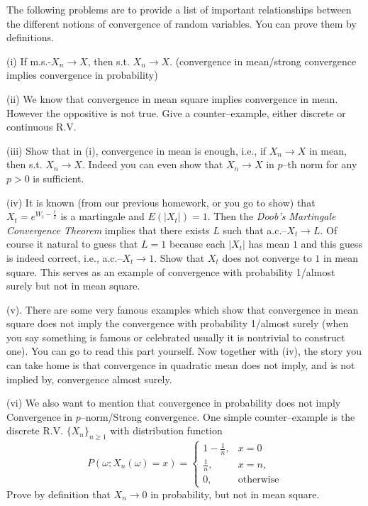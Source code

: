     \problem
    \begin{question}
        The following problems are to provide a list of important relationships
        between the different notions of convergence of random variables.
        You can prove them by definitions.

        \noindent(i)  If m.s.-$X_n\rightarrow X$, then s.t. $X_n\rightarrow X$.
        (convergence in mean/strong convergence implies convergence in probability)

        \noindent(ii)  We know that convergence in mean square implies convergence
        in mean.  However the oppositive is not true.  Give a counter--example,
        either discrete or continuous R.V.

        \noindent(iii)  Show that in (i), convergence in mean is enough,
        i.e., if $X_n\rightarrow X$ in mean, then s.t. $X_n\rightarrow X$.
        Indeed you can even show that $X_n\rightarrow X$ in $p$--th norm
        for any $p>0$ is sufficient.

        \noindent(iv) It is known (from our previous homework, or you go to show)
        that $X_t=e^{W_t-\frac{t}{2}}$ is a martingale and $E(|X_t|)=1$.
        Then the \emph{Doob's Martingale Convergence Theorem} implies that
        there exists $L$ such that a.c.--$X_t\rightarrow L$.  Of course it natural
        to guess that $L=1$ because each $|X_t|$ has mean $1$ and this guess
        is indeed correct, i.e., a.c.--$X_t\rightarrow 1$.  Show that $X_t$
        does not converge to $1$ in mean square.  This serves as an example
        of convergence with probability 1/almost surely but not in mean square.

        \noindent(v).  There are some very famous examples which show that
        convergence in mean square does not imply the convergence with probability
        1/almost surely (when you say something is famous or celebrated usually
        it is nontrivial to construct one).  You can go to read this part yourself.
        Now together with (iv), the story you can take home is that convergence
        in quadratic mean does not imply, and is not implied by, convergence almost surely.

        \noindent(vi)  We also want to mention that convergence in probability
        does not imply Convergence in $p$--norm/Strong convergence.
        One simple counter--example is the discrete R.V. $\{X_n\}_{n\geq1}$
        with distribution function
        \[P(\omega;X_n(\omega)=x)=
        \left\{
        \begin{array}{ll}
        1-\frac{1}{n},&x=0  \\
        \frac{1}{n},&x=n,\\
        0,&\text{otherwise}
        \end{array}
        \right.\]
        Prove by definition that $X_n\rightarrow 0$ in probability, but not in mean square.


\end{question}
